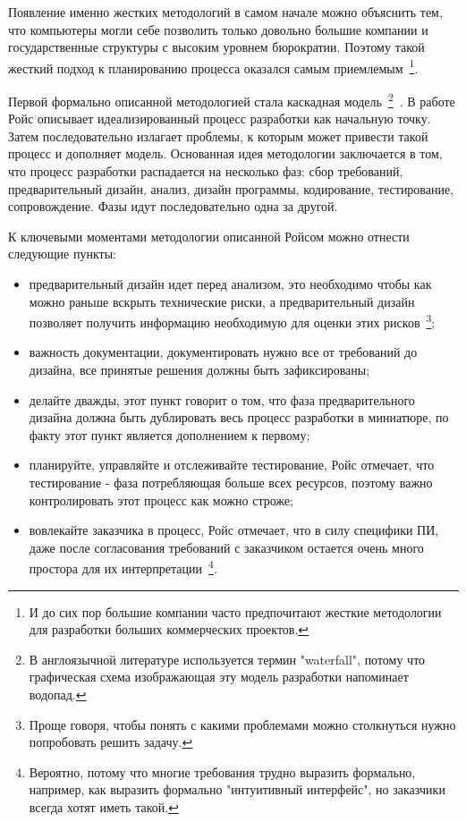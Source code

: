 Появление именно жестких методологий в самом начале можно объяснить тем, что компьютеры могли себе позволить только довольно большие компании и государственные структуры с высоким уровнем бюрократии. Поэтому такой жесткий подход к планированию процесса оказался самым приемлемым~\footnote{И до сих пор большие компании часто предпочитают жесткие методологии для разработки больших коммерческих проектов.}.

Первой формально описанной методологией стала каскадная модель~\footnote{В англоязычной литературе используется термин "waterfall", потому что графическая схема изображающая эту модель разработки напоминает водопад.}~\cite{Royce:1970:MDL}. В работе Ройс описывает идеализированный процесс разработки как начальную точку. Затем последовательно излагает проблемы, к которым может привести такой процесс и дополняет модель. Основанная идея методологии заключается в том, что процесс разработки распадается на несколько фаз: сбор требований, предварительный дизайн, анализ, дизайн программы, кодирование, тестирование, сопровождение. Фазы идут последовательно одна за другой.

К ключевыми моментами методологии описанной Ройсом можно отнести следующие пункты:
\begin{itemize}
  \item предварительный дизайн идет перед анализом, это необходимо чтобы как можно раньше вскрыть технические риски, а предварительный дизайн позволяет получить информацию необходимую для оценки этих рисков~\footnote{Проще говоря, чтобы понять с какими проблемами можно столкнуться нужно попробовать решить задачу.};
  \item важность документации, документировать нужно все от требований до дизайна, все принятые решения должны быть зафиксированы;
  \item делайте дважды, этот пункт говорит о том, что фаза предварительного дизайна должна быть дублировать весь процесс разработки в миниатюре, по факту этот пункт является дополнением к первому;
  \item планируйте, управляйте и отслеживайте тестирование, Ройс отмечает, что тестирование - фаза потребляющая больше всех ресурсов, поэтому важно контролировать этот процесс как можно строже;
  \item вовлекайте заказчика в процесс, Ройс отмечает, что в силу специфики ПИ, даже после согласования требований с заказчиком остается очень много простора для их интерпретации~\footnote{Вероятно, потому что многие требования трудно выразить формально, например, как выразить формально "интуитивный интерфейс", но заказчики всегда хотят иметь такой.}.
\end{itemize}

